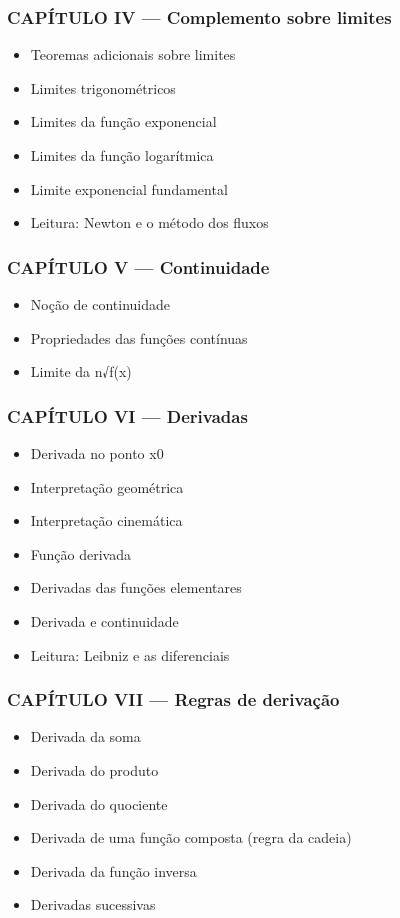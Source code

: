 \documentclass[a4paper,12pt]{article}[abntex2]
\begin{document}
\subsubsection*{CAPÍTULO IV — Complemento sobre limites}

\begin{itemize}
\item Teoremas adicionais sobre limites
\item Limites trigonométricos
\item Limites da função exponencial
\item Limites da função logarítmica
\item Limite exponencial fundamental
\item Leitura: Newton e o método dos fluxos
\end{itemize}
\subsubsection*{CAPÍTULO V — Continuidade}

\begin{itemize}
\item Noção de continuidade
\item Propriedades das funções contínuas
\item Limite da n√f(x)
\end{itemize}
\subsubsection*{CAPÍTULO VI — Derivadas}

\begin{itemize}
\item Derivada no ponto x0
\item Interpretação geométrica
\item Interpretação cinemática
\item Função derivada
\item Derivadas das funções elementares
\item Derivada e continuidade
\item Leitura: Leibniz e as diferenciais
\end{itemize}
\subsubsection*{CAPÍTULO VII — Regras de derivação}

\begin{itemize}
\item Derivada da soma
\item Derivada do produto
\item Derivada do quociente
\item Derivada de uma função composta (regra da cadeia)
\item Derivada da função inversa
\item Derivadas sucessivas
\end{itemize}
\end{document}
